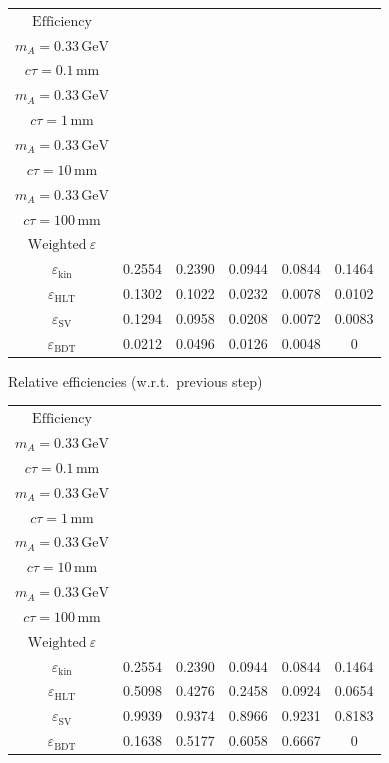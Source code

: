 \documentclass[10pt,a4paper]{article}
\begin{document}
{\begin{tabular}{cccccc}
\toprule
$\mathrm{Efficiency}$ & \shortstack{$m_{\pi}=1\,\mathrm{GeV}$\\$m_{A}=0.33\,\mathrm{GeV}$\\$c\tau=0.1\,\mathrm{mm}$} & \shortstack{$m_{\pi}=1\,\mathrm{GeV}$\\$m_{A}=0.33\,\mathrm{GeV}$\\$c\tau=1\,\mathrm{mm}$} & \shortstack{$m_{\pi}=1\,\mathrm{GeV}$\\$m_{A}=0.33\,\mathrm{GeV}$\\$c\tau=10\,\mathrm{mm}$} & \shortstack{$m_{\pi}=1\,\mathrm{GeV}$\\$m_{A}=0.33\,\mathrm{GeV}$\\$c\tau=100\,\mathrm{mm}$} & \shortstack{$\mathrm{QCD}$\\$\mathrm{Weighted}\ \varepsilon$} \\
\midrule
$\varepsilon_{\mathrm{kin}}$ & 0.2554 & 0.2390 & 0.0944 & 0.0844 & 0.1464\\
$\varepsilon_{\mathrm{HLT}}$ & 0.1302 & 0.1022 & 0.0232 & 0.0078 & 0.0102\\
$\varepsilon_{\mathrm{SV}}$ & 0.1294 & 0.0958 & 0.0208 & 0.0072 & 0.0083\\
$\varepsilon_{\mathrm{BDT}}$ & 0.0212 & 0.0496 & 0.0126 & 0.0048 & $0$\\
\bottomrule
\end{tabular}

\vspace{18pt}

Relative efficiencies (w.r.t.\ previous step)

\begin{tabular}{cccccc}
\toprule
$\mathrm{Efficiency}$ & \shortstack{$m_{\pi}=1\,\mathrm{GeV}$\\$m_{A}=0.33\,\mathrm{GeV}$\\$c\tau=0.1\,\mathrm{mm}$} & \shortstack{$m_{\pi}=1\,\mathrm{GeV}$\\$m_{A}=0.33\,\mathrm{GeV}$\\$c\tau=1\,\mathrm{mm}$} & \shortstack{$m_{\pi}=1\,\mathrm{GeV}$\\$m_{A}=0.33\,\mathrm{GeV}$\\$c\tau=10\,\mathrm{mm}$} & \shortstack{$m_{\pi}=1\,\mathrm{GeV}$\\$m_{A}=0.33\,\mathrm{GeV}$\\$c\tau=100\,\mathrm{mm}$} & \shortstack{$\mathrm{QCD}$\\$\mathrm{Weighted}\ \varepsilon$} \\
\midrule
$\varepsilon_{\mathrm{kin}}$ & 0.2554 & 0.2390 & 0.0944 & 0.0844 & 0.1464\\
$\varepsilon_{\mathrm{HLT}}$ & 0.5098 & 0.4276 & 0.2458 & 0.0924 & 0.0654\\
$\varepsilon_{\mathrm{SV}}$ & 0.9939 & 0.9374 & 0.8966 & 0.9231 & 0.8183\\
$\varepsilon_{\mathrm{BDT}}$ & 0.1638 & 0.5177 & 0.6058 & 0.6667 & $0$\\
\bottomrule
\end{tabular}

}
\end{document}
